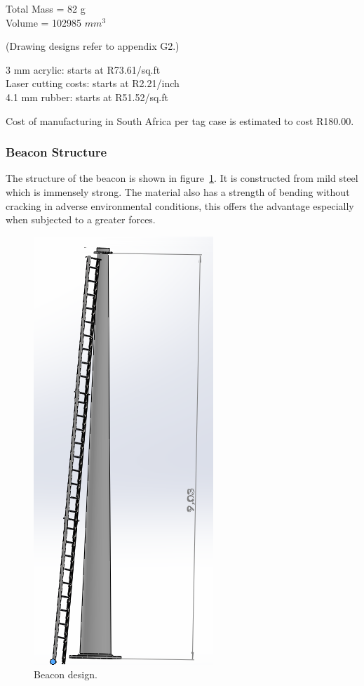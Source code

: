 \begin{center}
Total Mass = 82 g \\
Volume = 102985 $mm^3$
\end{center}

(Drawing designs refer to appendix G2.)

\newpage
{}
3 mm acrylic: starts at R73.61/sq.ft \\
Laser cutting costs: starts at R2.21/inch \\
4.1 mm rubber: starts at R51.52/sq.ft 

Cost of manufacturing in South Africa per tag case is estimated to cost R180.00.

\subsubsection{Beacon Structure}

The structure of the beacon is shown in figure~\ref{fig:mech-6}. It is constructed from mild steel which is immensely strong. The material also has a strength of bending without cracking in adverse environmental conditions, this offers the advantage especially when subjected to a greater forces.\cite{mech-3}

\begin{figure}[H]
\begin{center}
\includegraphics[scale=0.8]{data/mechanical/6.png}
\caption{Beacon design.}
\label{fig:mech-6}
\end{center}
\end{figure}


